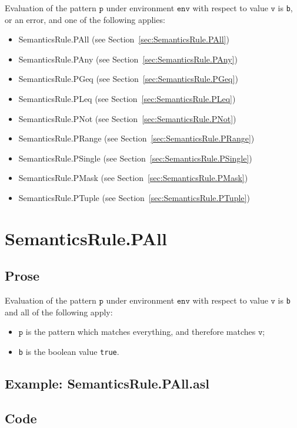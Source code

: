 \documentclass{book}
\newcommand\env[0]{\texttt{env}}
\newcommand\vp[0]{\texttt{p}}
\newcommand\vv[0]{\texttt{v}}
\begin{document}
Evaluation of the pattern $\vp$ under environment $\env$ with
respect to value $\vv$ is \texttt{b}, or an error, and one of the
following applies:
\begin{itemize}
\item SemanticsRule.PAll (see Section~\ref{sec:SemanticsRule.PAll})
\item SemanticsRule.PAny (see Section~\ref{sec:SemanticsRule.PAny})
\item SemanticsRule.PGeq (see Section~\ref{sec:SemanticsRule.PGeq})
\item SemanticsRule.PLeq (see Section~\ref{sec:SemanticsRule.PLeq})
\item SemanticsRule.PNot (see Section~\ref{sec:SemanticsRule.PNot})
\item SemanticsRule.PRange (see Section~\ref{sec:SemanticsRule.PRange})
\item SemanticsRule.PSingle (see Section~\ref{sec:SemanticsRule.PSingle})
\item SemanticsRule.PMask (see Section~\ref{sec:SemanticsRule.PMask})
\item SemanticsRule.PTuple (see Section~\ref{sec:SemanticsRule.PTuple})
\end{itemize}

\section{SemanticsRule.PAll \label{sec:SemanticsRule.PAll}}

  \subsection{Prose}
  Evaluation of the pattern $\vp$ under environment $\env$ with
  respect to value $\vv$ is \texttt{b} and all of the following apply:
  \begin{itemize}
    \item $\vp$ is the pattern which matches everything, and therefore
      matches $\vv$;
    \item \texttt{b} is the boolean value \texttt{true}.
  \end{itemize}

  \subsection{Example: SemanticsRule.PAll.asl}

  \subsection{Code}
\end{document}
